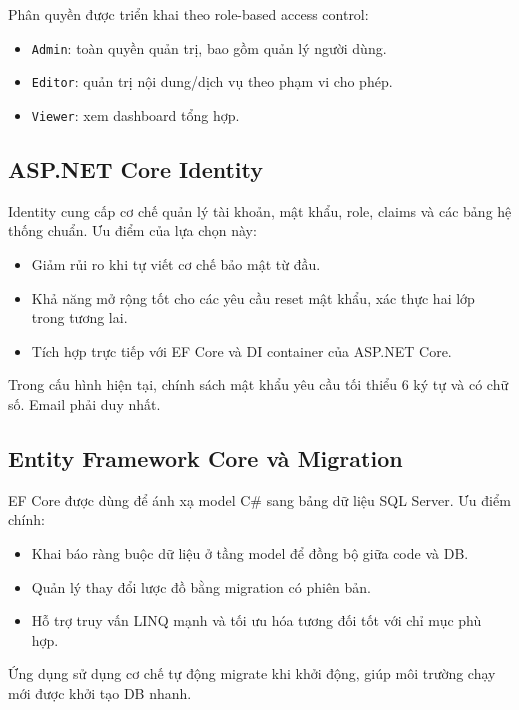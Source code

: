 \documentclass[12pt,a4paper]{article}
\begin{document}
Phân quyền được triển khai theo role-based access control:
\begin{itemize}[leftmargin=1.1cm]
  \item \texttt{Admin}: toàn quyền quản trị, bao gồm quản lý người dùng.
  \item \texttt{Editor}: quản trị nội dung/dịch vụ theo phạm vi cho phép.
  \item \texttt{Viewer}: xem dashboard tổng hợp.
\end{itemize}

\subsection{ASP.NET Core Identity}
Identity cung cấp cơ chế quản lý tài khoản, mật khẩu, role, claims và các bảng hệ thống chuẩn. Ưu điểm của lựa chọn này:
\begin{itemize}[leftmargin=1.1cm]
  \item Giảm rủi ro khi tự viết cơ chế bảo mật từ đầu.
  \item Khả năng mở rộng tốt cho các yêu cầu reset mật khẩu, xác thực hai lớp trong tương lai.
  \item Tích hợp trực tiếp với EF Core và DI container của ASP.NET Core.
\end{itemize}

Trong cấu hình hiện tại, chính sách mật khẩu yêu cầu tối thiểu 6 ký tự và có chữ số. Email phải duy nhất.

\subsection{Entity Framework Core và Migration}
EF Core được dùng để ánh xạ model C\# sang bảng dữ liệu SQL Server. Ưu điểm chính:
\begin{itemize}[leftmargin=1.1cm]
  \item Khai báo ràng buộc dữ liệu ở tầng model để đồng bộ giữa code và DB.
  \item Quản lý thay đổi lược đồ bằng migration có phiên bản.
  \item Hỗ trợ truy vấn LINQ mạnh và tối ưu hóa tương đối tốt với chỉ mục phù hợp.
\end{itemize}

Ứng dụng sử dụng cơ chế tự động migrate khi khởi động, giúp môi trường chạy mới được khởi tạo DB nhanh.
\end{document}
